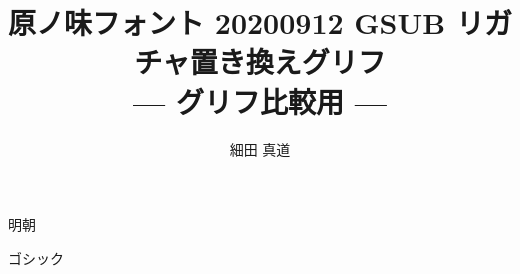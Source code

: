 \documentclass[dvipdfmx]{jsarticle}
\title{原ノ味フォント 20200912 GSUB リガチャ置き換えグリフ \\
--- グリフ比較用 ---}
\author{細田 真道}
\begin{document}
\maketitle

\clearpage
\parindent=0pt
\fboxsep=0pt

\mcfamily
{\Large 明朝}

\testAll

\clearpage

\gtfamily
{\Large ゴシック}

\testAll
\end{document}
